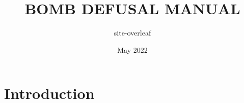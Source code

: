 \documentclass{ktane-man}
\title{BOMB DEFUSAL MANUAL}
\author{site-overleaf }
\date{May 2022}
\begin{document}
  \maketitle

  \section{Introduction}\label{sec:introduction}

  
\end{document}
